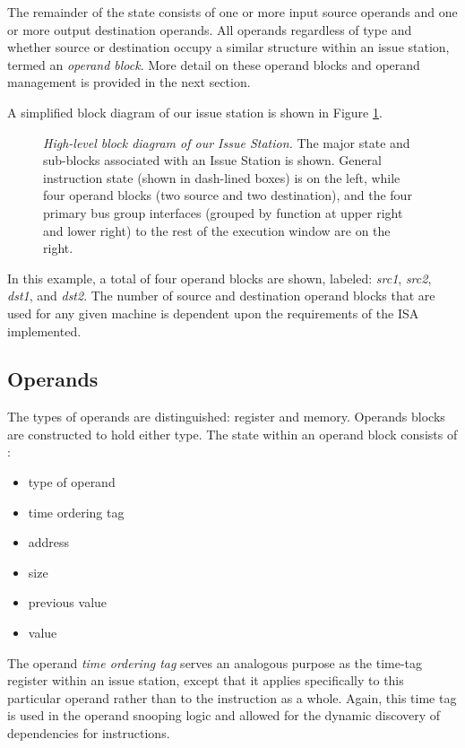 \documentclass[10pt,twocolumn,dvips]{article}
\begin{document}
The remainder of the state consists of one or more input
source operands and one or more output destination operands.
All operands regardless of type and whether source or destination
occupy a similar structure within an issue station, termed an
\textit{operand block}.
More detail on these operand blocks and operand management
is provided in the next section.

A simplified block diagram of our issue station is shown in 
Figure \ref{fig:issuestation}.
%
\begin{figure}
\scriptsize {
}
\caption{{\em High-level block diagram of our Issue Station.} 
The major state and sub-blocks associated with an Issue Station is shown.
General instruction state (shown in dash-lined boxes) is
on the left, while
four operand blocks (two source and two destination),
and the four primary bus group interfaces (grouped by function at
upper right and lower right) to the rest of the
execution window are on the right.}
\label{fig:issuestation}
\end{figure}
%
In this example, a total of four operand blocks are shown, labeled:
\textit{src1}, 
\textit{src2}, 
\textit{dst1}, 
and \textit{dst2}.
The number of source and destination operand blocks that are
used for any given machine is dependent upon the requirements
of the ISA implemented.
%
%
\subsection{Operands}
%
The types of operands are distinguished: register and memory.
Operands blocks are constructed to hold either type.
The state within an operand block consists of :
%
\begin{itemize}
\vspace{-0.10in}
\item{type of operand}
\vspace{-0.10in}
\item{time ordering tag}
\vspace{-0.10in}
\item{address}
\vspace{-0.10in}
\item{size}
\vspace{-0.10in}
\item{previous value}
\vspace{-0.10in}
\item{value}
\vspace{-0.10in}
\end{itemize}   
%
The operand \textit{time ordering tag}
serves
an analogous purpose as the time-tag register within an issue station,
except that it applies specifically to this particular
operand rather than to the instruction as a whole.
Again, this time tag is used in the operand snooping logic
and allowed for the dynamic discovery of dependencies
for instructions.
\end{document}

